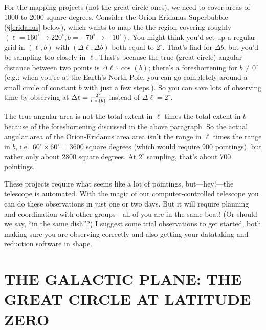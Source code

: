 \documentclass[preprint]{aastex}
\begin{document}
For the mapping projects (not the great-circle ones), we need to cover
areas of 1000 to 2000 square degrees. Consider the Orion-Eridanus
Superbubble (\S \ref{eridanus} below), which wants to map the the region
covering roughly $(\ell=160^\circ \rightarrow 220^\circ, b=-70^\circ
\rightarrow -10^\circ)$. You might think you'd set up a regular grid in
$(\ell,b)$ with $(\Delta \ell, \Delta b)$ both equal to
$2^\circ$. That's find for $\Delta b$, but you'd be sampling too closely
in $\ell$. That's because the true (great-circle) angular distance
between two points is $\Delta \ell \cdot \cos(b)$; there's a
foreshortening for $b \ne 0^\circ$ (e.g.: when you're at the Earth's
North Pole, you can go completely around a small circle of constant $b$
with just a few steps.). So you can save lots of observing time by
observing at $\Delta \ell = {2^\circ \over \cos(b)}$ instead of $\Delta
\ell = 2^\circ$.

The true angular area is not the total extent in $\ell$ times the total
extent in $b$ because of the foreshortening discussed in the above
paragraph. So the actual angular area of the Orion-Eridanus area area
isn't the range in $\ell$ times the range in $b$, i.e.\ $60^\circ
\times 60^\circ = 3600$ square degrees (which would require 900
pointings), but rather only about 2800 square degrees.  At $2^\circ$
sampling, that's about 700 pointings.

These projects require what seems like a lot of pointings,
but---hey!---the telescope is automated. With the magic of our
computer-controlled telescope you can do these observations in just one
or two days. But it will require planning and coordination with other
groups---all of you are in the same boat! (Or should we say, ``in the
same dish''?) I suggest some trial observations to get started, both
making sure you are observing correctly and also getting your datataking
and reduction software in shape.

\section{THE GALACTIC PLANE: THE GREAT CIRCLE AT LATITUDE ZERO 
} 
\label{galacticplane}
\end{document}
